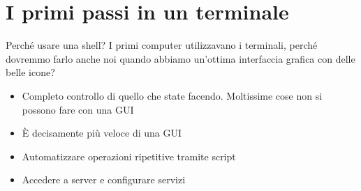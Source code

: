 \section{I primi passi in un terminale}
\begin{frame}{Perché usare una shell?}
  I primi computer utilizzavano i terminali, perché dovremmo farlo anche noi
  quando abbiamo un'ottima interfaccia grafica con delle belle icone?\bigskip

  \begin{itemize}
    \item Completo controllo di quello che state facendo. 
      Moltissime cose non si possono fare con una GUI
    \item È decisamente più veloce di una GUI
    \item Automatizzare operazioni ripetitive tramite script
    \item Accedere a server e configurare servizi
  \end{itemize}
\end{frame}
